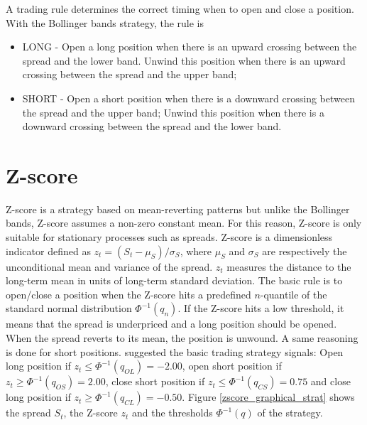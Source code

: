 \documentclass[11pt,a4,twosided,singlespacing,titlepagenumber=on]{scrreprt}
\numberwithin{equation}{chapter} %
\theoremstyle{remark}
\begin{document}
A trading rule determines the correct timing when to open and close a position. With the Bollinger bands strategy, the rule is

\begin{itemize}
\item LONG - Open a long position when there is an upward crossing between the spread and the lower band. Unwind this position when there is an upward crossing between the spread and the upper band;
\item SHORT - Open a short position when there is a downward crossing between the spread and the upper band; Unwind this position when there is a downward crossing between the spread and the lower band.
\end{itemize}

\section{Z-score}
Z-score is a strategy based on mean-reverting patterns but unlike the Bollinger bands, Z-score assumes a non-zero constant mean. For this reason, Z-score is only suitable for stationary processes such as spreads. Z-score is a dimensionless indicator defined as $z_t = (S_t-\mu_S) / \sigma_S$, where $\mu_S$ and $\sigma_S$ are respectively the unconditional mean and variance of the spread. $z_t$ measures the distance to the long-term mean in units of long-term standard deviation. The basic rule is to open/close a position when the Z-score hits a predefined $n$-quantile of the standard normal distribution $\Phi^{-1}(q_n)$. If the Z-score hits a low threshold, it means that the spread is underpriced and a long position should be opened. When the spread reverts to its mean, the position is unwound. A same reasoning is done for short positions. \cite{caldeira2013} suggested the basic trading strategy signals: Open long position if $z_t \leq \Phi^{-1}(q_{OL}) = -2.00$, open short position if $z_t \geq \Phi^{-1}(q_{OS}) = 2.00$, close short position if $z_t \leq \Phi^{-1}(q_{CS}) = 0.75$ and close long position if $z_t \geq \Phi^{-1}(q_{CL}) = -0.50$. Figure \ref{zscore_graphical_strat} shows the spread $S_t$, the Z-score $z_t$ and the thresholds $\Phi^{-1}(q)$ of the strategy.
\end{document}
